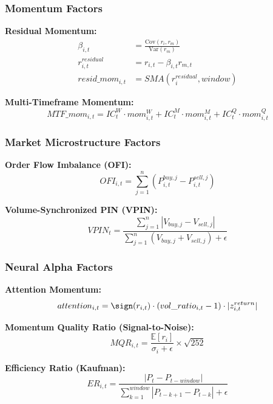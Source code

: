 \documentclass[11pt,letterpaper]{book}
\newcommand{\E}{\mathbb{E}}
\newcommand{\Var}{\mathrm{Var}}
\newcommand{\Cov}{\mathrm{Cov}}
\begin{document}
\subsubsection{Momentum Factors}

\textbf{Residual Momentum:}
\begin{align}
\beta_{i,t} &= \frac{\Cov(r_{i}, r_{m})}{\Var(r_m)} \\
r_{i,t}^{residual} &= r_{i,t} - \beta_{i,t} r_{m,t} \\
resid\_mom_{i,t} &= SMA(r_{i}^{residual}, window)
\end{align}

\textbf{Multi-Timeframe Momentum:}
\begin{equation}
MTF\_mom_{i,t} = IC_t^{W} \cdot mom_{i,t}^{W} + IC_t^{M} \cdot mom_{i,t}^{M} + IC_t^{Q} \cdot mom_{i,t}^{Q}
\end{equation}

\subsubsection{Market Microstructure Factors}

\textbf{Order Flow Imbalance (OFI):}
\begin{equation}
OFI_{i,t} = \sum_{j=1}^{n} (P_{i,t}^{buy,j} - P_{i,t}^{sell,j})
\end{equation}

\textbf{Volume-Synchronized PIN (VPIN):}
\begin{equation}
VPIN_t = \frac{\sum_{j=1}^{n} |V_{buy,j} - V_{sell,j}|}{\sum_{j=1}^{n} (V_{buy,j} + V_{sell,j}) + \epsilon}
\end{equation}

\subsubsection{Neural Alpha Factors}

\textbf{Attention Momentum:}
\begin{equation}
attention_{i,t} = \sign(r_{i,t}) \cdot (vol\_ratio_{i,t} - 1) \cdot |z_{i,t}^{return}|
\end{equation}

\textbf{Momentum Quality Ratio (Signal-to-Noise):}
\begin{equation}
MQR_{i,t} = \frac{\E[r_{i}]}{\sigma_{i} + \epsilon} \times \sqrt{252}
\end{equation}

\textbf{Efficiency Ratio (Kaufman):}
\begin{equation}
ER_{i,t} = \frac{|P_t - P_{t-window}|}{\sum_{k=1}^{window} |P_{t-k+1} - P_{t-k}| + \epsilon}
\end{equation}
\end{document}
